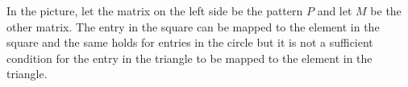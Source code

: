 In the picture, let the matrix on the left side be the pattern $P$ and let $M$ be the other matrix. The entry in the square can be mapped to the element in the square and the same holds for entries in the circle but it is not a sufficient condition for the entry in the triangle to be mapped to the element in the triangle.